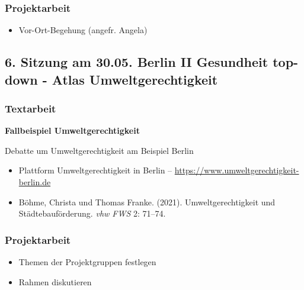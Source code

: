 \documentclass[
  ngerman,
]{article}
\providecommand{\tightlist}{%
  \setlength{\itemsep}{0pt}\setlength{\parskip}{0pt}}
\begin{document}
\hypertarget{projektarbeit-3}{%
\subsubsection*{Projektarbeit}\label{projektarbeit-3}}

\begin{itemize}
\tightlist
\item
  Vor-Ort-Begehung (angefr. Angela)
\end{itemize}

\hypertarget{sitzung-am-30.05.-berlin-ii-gesundheit-top-down---atlas-umweltgerechtigkeit}{%
\subsection*{6. Sitzung am 30.05. \textbar{} Berlin II Gesundheit top-down - Atlas Umweltgerechtigkeit}\label{sitzung-am-30.05.-berlin-ii-gesundheit-top-down---atlas-umweltgerechtigkeit}}

\hypertarget{textarbeit-5}{%
\subsubsection*{Textarbeit}\label{textarbeit-5}}

\textbf{Fallbeispiel Umweltgerechtigkeit}

Debatte um Umweltgerechtigkeit am Beispiel Berlin

\begin{itemize}
\tightlist
\item
  Plattform Umweltgerechtigkeit in Berlin -- \url{https://www.umweltgerechtigkeit-berlin.de}
\item
  Böhme, Christa und Thomas Franke. (2021). Umweltgerechtigkeit und Städtebauförderung. \emph{vhw FWS} 2: 71--74.
\end{itemize}

\hypertarget{projektarbeit-4}{%
\subsubsection*{Projektarbeit}\label{projektarbeit-4}}

\begin{itemize}
\tightlist
\item
  Themen der Projektgruppen festlegen
\item
  Rahmen diskutieren
\end{itemize}
\end{document}
